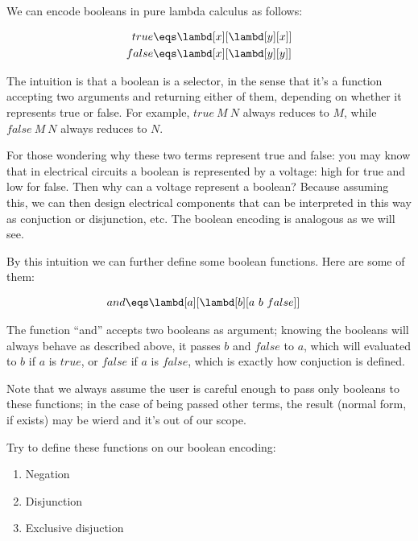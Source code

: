 \documentclass[../../../include/open-logic-section]{subfiles}
\begin{document}

We can encode booleans in pure lambda calculus as follows:

\begin{align*}
  {true} &\eqs \lambd[x][\lambd[y][x]]\\
  {false} &\eqs \lambd[x][\lambd[y][y]]
\end{align*}

The intuition is that a boolean is a selector, in the sense that it's a function accepting two arguments
and returning either of them, depending on whether it represents true or
false. For example, $true ~ M ~ N$ always reduces to $M$, while $false
~ M ~ N$ always reduces to $N$.

\begin{explain}
  For those wondering why these two terms represent true and false:
  you may know that in electrical circuits a boolean is represented by
  a voltage: high for true and low for false. Then why can a voltage
  represent a boolean? Because assuming this, we can then design
  electrical components that can be interpreted in this way as conjuction or
  disjunction, etc. The boolean encoding is analogous as we will see.
\end{explain}


By this intuition we can further define some boolean functions. Here
are some of them:

\begin{align*}
  {and} &\eqs \lambd[a][\lambd[b][a ~ b ~ {false}]]
\end{align*}

The function ``and'' accepts two booleans as argument; knowing the
booleans will always behave as described above, it passes $b$ and ${false}$
to $a$, which will evaluated to $b$ if $a$ is ${true}$, or ${false}$ if $a$ is ${false}$,
which is exactly how conjuction is defined.

Note that we always assume the user is careful enough to pass only booleans to these functions; in the
case of being passed other terms, the result (normal form, if exists) may be wierd and it's
out of our scope.

\begin{prob}
  Try to define these functions on our boolean encoding:
  \begin{enumerate}
  \item Negation
  \item Disjunction
  \item Exclusive disjuction
  \end{enumerate}
\end{prob}
\end{document}
